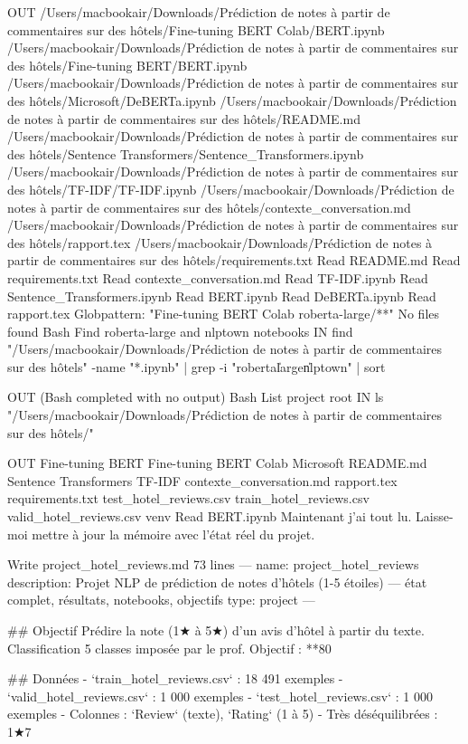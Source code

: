 OUT
/Users/macbookair/Downloads/Prédiction de notes à partir de commentaires sur des hôtels/Fine-tuning BERT Colab/BERT.ipynb
/Users/macbookair/Downloads/Prédiction de notes à partir de commentaires sur des hôtels/Fine-tuning BERT/BERT.ipynb
/Users/macbookair/Downloads/Prédiction de notes à partir de commentaires sur des hôtels/Microsoft/DeBERTa.ipynb
/Users/macbookair/Downloads/Prédiction de notes à partir de commentaires sur des hôtels/README.md
/Users/macbookair/Downloads/Prédiction de notes à partir de commentaires sur des hôtels/Sentence Transformers/Sentence_Transformers.ipynb
/Users/macbookair/Downloads/Prédiction de notes à partir de commentaires sur des hôtels/TF-IDF/TF-IDF.ipynb
/Users/macbookair/Downloads/Prédiction de notes à partir de commentaires sur des hôtels/contexte_conversation.md
/Users/macbookair/Downloads/Prédiction de notes à partir de commentaires sur des hôtels/rapport.tex
/Users/macbookair/Downloads/Prédiction de notes à partir de commentaires sur des hôtels/requirements.txt
Read README.md
Read requirements.txt
Read contexte_conversation.md
Read TF-IDF.ipynb
Read Sentence_Transformers.ipynb
Read BERT.ipynb
Read DeBERTa.ipynb
Read rapport.tex
Globpattern: "Fine-tuning BERT Colab roberta-large/**"
No files found
Bash Find roberta-large and nlptown notebooks
IN
find "/Users/macbookair/Downloads/Prédiction de notes à partir de commentaires sur des hôtels" -name "*.ipynb" | grep -i "roberta\|large\|nlptown" | sort

OUT
(Bash completed with no output)
Bash List project root
IN
ls "/Users/macbookair/Downloads/Prédiction de notes à partir de commentaires sur des hôtels/"

OUT
Fine-tuning BERT
Fine-tuning BERT Colab
Microsoft
README.md
Sentence Transformers
TF-IDF
contexte_conversation.md
rapport.tex
requirements.txt
test_hotel_reviews.csv
train_hotel_reviews.csv
valid_hotel_reviews.csv
venv
Read BERT.ipynb
Maintenant j'ai tout lu. Laisse-moi mettre à jour la mémoire avec l'état réel du projet.

Write project_hotel_reviews.md
73 lines
---
name: project_hotel_reviews
description: Projet NLP de prédiction de notes d'hôtels (1-5 étoiles) — état complet, résultats, notebooks, objectifs
type: project
---

## Objectif
Prédire la note (1★ à 5★) d'un avis d'hôtel à partir du texte. Classification 5 classes imposée par le prof. Objectif : **80%

## Données
- `train_hotel_reviews.csv` : 18 491 exemples
- `valid_hotel_reviews.csv` : 1 000 exemples
- `test_hotel_reviews.csv` : 1 000 exemples
- Colonnes : `Review` (texte), `Rating` (1 à 5)
- Très déséquilibrées : 1★7%

